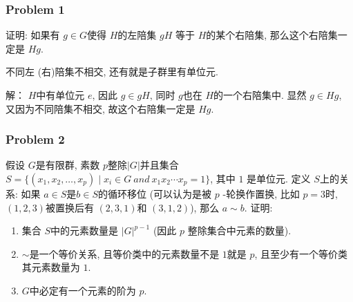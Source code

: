 \documentclass[a4paper,12pt]{ctexart}
\begin{document}
      

\subsubsection*{Problem 1}
证明: 如果有 $ g\in G $使得 $ H $的左陪集 $ gH $ 等于 $ H $的某个右陪集, 那么这个右陪集一定是 $ Hg $.

      不同左 (右)陪集不相交, 还有就是子群里有单位元.

   解： $ H $中有单位元 $ e $, 因此 $ g\in gH $, 同时 $ g $也在 $ H $的一个右陪集中. 
    显然 $ g\in Hg $, 又因为不同陪集不相交, 故这个右陪集一定是 $ Hg $.   

\subsubsection*{Problem 2}
    假设 $ G $是有限群, 素数 $ p $整除$ \rvert G\lvert $并且集合 $ S=\{(x_1,x_2,\dots,x_p)\mid x_i\in G~and~x_1x_2\cdots x_p=1\} $, 其中 $ 1 $ 是单位元. 
    定义 $ S $上的关系: 如果 $ a\in S $是$ b\in S $的循环移位 (可以认为是被 $ p $ -轮换作置换, 比如 $ p=3 $时, $(1,2,3)$被置换后有 $ (2,3,1) $和 $ (3,1,2) $), 那么 $ a\sim b $.
    证明:
    \begin{enumerate}
      \item 集合 $ S $中的元素数量是 $ \rvert G\lvert^{p-1} $ (因此 $ p $ 整除集合中元素的数量).
      \item $ \sim $是一个等价关系, 且等价类中的元素数量不是 $ 1 $就是 $ p $, 且至少有一个等价类其元素数量为 $ 1 $.
      \item $ G $中必定有一个元素的阶为 $ p $.
    \end{enumerate}
    
\end{document}
